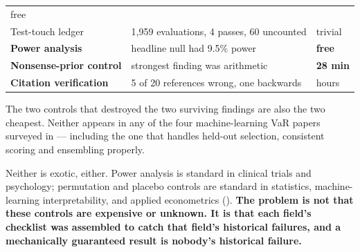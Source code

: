 \begin{longtable}[]{@{}lll@{}}
\begin{minipage}[t]{0.30\columnwidth}
free\strut
\end{minipage}\tabularnewline
\begin{minipage}[t]{0.30\columnwidth}\raggedright
Test-touch ledger\strut
\end{minipage} & \begin{minipage}[t]{0.30\columnwidth}\raggedright
1,959 evaluations, 4 passes, 60 uncounted\strut
\end{minipage} & \begin{minipage}[t]{0.30\columnwidth}\raggedright
trivial\strut
\end{minipage}\tabularnewline
\begin{minipage}[t]{0.30\columnwidth}\raggedright
\textbf{Power analysis}\strut
\end{minipage} & \begin{minipage}[t]{0.30\columnwidth}\raggedright
headline null had 9.5\% power\strut
\end{minipage} & \begin{minipage}[t]{0.30\columnwidth}\raggedright
\textbf{free}\strut
\end{minipage}\tabularnewline
\begin{minipage}[t]{0.30\columnwidth}\raggedright
\textbf{Nonsense-prior control}\strut
\end{minipage} & \begin{minipage}[t]{0.30\columnwidth}\raggedright
strongest finding was arithmetic\strut
\end{minipage} & \begin{minipage}[t]{0.30\columnwidth}\raggedright
\textbf{28 min}\strut
\end{minipage}\tabularnewline
\begin{minipage}[t]{0.30\columnwidth}\raggedright
\textbf{Citation verification}\strut
\end{minipage} & \begin{minipage}[t]{0.30\columnwidth}\raggedright
5 of 20 references wrong, one backwards\strut
\end{minipage} & \begin{minipage}[t]{0.30\columnwidth}\raggedright
hours\strut
\end{minipage}\tabularnewline
\bottomrule
\end{longtable}

The two controls that destroyed the two surviving findings are also the two cheapest. Neither
appears in any of the four machine-learning VaR papers surveyed in  --- including the one that
handles held-out selection, consistent scoring and ensembling properly.

Neither is exotic, either. Power analysis is standard in clinical trials and psychology;
permutation and placebo controls are standard in statistics, machine-learning
interpretability, and applied econometrics (). \textbf{The problem is not that these controls are
expensive or unknown. It is that each field's checklist was assembled to catch that field's
historical failures, and a mechanically guaranteed result is nobody's historical failure.}
